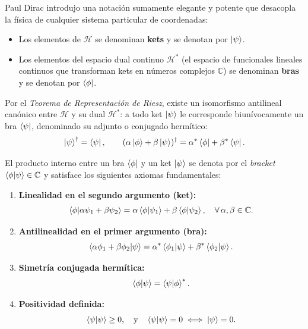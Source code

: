 Paul Dirac introdujo una notación sumamente elegante y potente que desacopla la física de cualquier sistema particular de coordenadas:
\begin{itemize}
    \item Los elementos de $\mathcal{H}$ se denominan \textbf{kets} y se denotan por $\left| \psi \right\rangle$.
    \item Los elementos del espacio dual continuo $\mathcal{H}^*$ (el espacio de funcionales lineales continuos que transforman kets en números complejos $\mathbb{C}$) se denominan \textbf{bras} y se denotan por $\left\langle \phi \right|$.
\end{itemize}

Por el \textit{Teorema de Representación de Riesz}, existe un isomorfismo antilineal canónico entre $\mathcal{H}$ y su dual $\mathcal{H}^*$: a todo ket $\left| \psi \right\rangle$ le corresponde biunívocamente un bra $\left\langle \psi \right|$, denominado su adjunto o conjugado hermítico:
\begin{equation}
    \left| \psi \right\rangle^\dagger = \left\langle \psi \right|, \qquad (\alpha\left| \phi \right\rangle + \beta\left| \psi \right\rangle)^\dagger = \alpha^*\left\langle \phi \right| + \beta^*\left\langle \psi \right|.
    \label{eq:riesz_adjoint}
\end{equation}

El producto interno entre un bra $\left\langle \phi \right|$ y un ket $\left| \psi \right\rangle$ se denota por el \textit{bracket} $\left\langle \phi \middle| \psi \right\rangle \in \mathbb{C}$ y satisface los siguientes axiomas fundamentales:
\begin{enumerate}
    \item \textbf{Linealidad en el segundo argumento (ket):}
    \begin{equation}
        \left\langle \phi \middle| \alpha\psi_1 + \beta\psi_2 \right\rangle = \alpha\left\langle \phi \middle| \psi_1 \right\rangle + \beta\left\langle \phi \middle| \psi_2 \right\rangle, \quad \forall\,\alpha, \beta \in \mathbb{C}.
    \end{equation}
    \item \textbf{Antilinealidad en el primer argumento (bra):}
    \begin{equation}
        \left\langle \alpha\phi_1 + \beta\phi_2 \middle| \psi \right\rangle = \alpha^*\left\langle \phi_1 \middle| \psi \right\rangle + \beta^*\left\langle \phi_2 \middle| \psi \right\rangle.
    \end{equation}
    \item \textbf{Simetría conjugada hermítica:}
    \begin{equation}
        \left\langle \phi \middle| \psi \right\rangle = \left\langle \psi \middle| \phi \right\rangle^*.
        \label{eq:hermitian_symmetry}
    \end{equation}
    \item \textbf{Positividad definida:}
    \begin{equation}
        \left\langle \psi \middle| \psi \right\rangle \ge 0, \quad \text{y} \quad \left\langle \psi \middle| \psi \right\rangle = 0 \iff \left| \psi \right\rangle = 0.
        \label{eq:positive_definite}
    \end{equation}
\end{enumerate}


